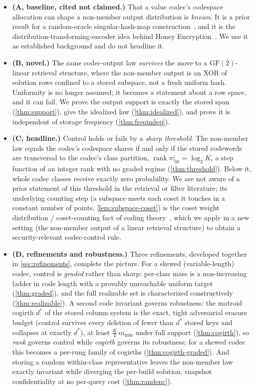 \documentclass[sigconf,nonacm,anonymous,balance=false]{acmart}
\newcommand{\GF}{\mathrm{GF}(2)}
\DeclareMathOperator{\rank}{rank}
\newcommand{\W}{W}                          %
\newcommand{\proj}{\pi}                     %
\begin{document}
\begin{itemize}
  \item \textbf{(A, baseline, cited not claimed.)} That a value codec's codespace
  allocation can shape a non-member output distribution is \emph{known}. It is a
  prior result for a random-oracle singular-hash-map
  construction~\cite{towell_bernoulli_maps}, and it is the
  distribution-transforming-encoder idea behind Honey
  Encryption~\cite{juels2014honey,cheng2019pmte}. We use it as established
  background and do not headline it.
  \item \textbf{(B, novel.)} The same codec-output law \emph{survives} the move to a
  $\GF$-linear retrieval structure, where the non-member output is an XOR of solution
  rows confined to a stored subspace, not a fresh uniform hash. Uniformity is no
  longer assumed; it becomes a statement about a row space, and it can fail. We prove
  the output support is exactly the stored span (\cref{thm:support}), give the
  idealized law (\cref{thm:idealized}), and prove it is independent of storage
  frequency (\cref{thm:freqindep}).
  \item \textbf{(C, headline.)} Control holds or fails by a \emph{sharp threshold}.
  The non-member law equals the codec's codespace shares if and only if the stored
  codewords are transversal to the codec's class partition, $\rank \proj|_{\W} =
  \log_2 K$, a step function of an integer rank with no graded regime
  (\cref{thm:threshold}). Below it, whole codec classes receive exactly zero
  probability. We are not aware of a prior statement of this threshold in the retrieval
  or filter literature; its underlying counting step (a subspace meets each coset it
  touches in a constant number of points, \cref{lem:subspace-coset}) is the coset weight
  distribution / coset-counting fact of coding theory~\cite{macwilliams1977}, which we
  apply in a new setting (the non-member output of a linear retrieval structure) to
  obtain a security-relevant codec-control rule.
  \item \textbf{(D, refinements and robustness.)} Three refinements, developed together in
  \cref{sec:refinements}, complete the picture. For a skewed (variable-length) codec,
  control is \emph{graded} rather than sharp: per-class mass is a non-increasing ladder in
  code length with a provably unreachable uniform target (\cref{thm:graded}), and the full
  realizable set is characterized constructively (\cref{thm:realizable}). A second code
  invariant governs robustness: the matroid cogirth $d^\ast$ of the stored column system is
  the exact, tight adversarial erasure budget (control survives every deletion of fewer than
  $d^\ast$ stored keys and collapses at exactly $d^\ast$), at least $\tfrac{K}{2}\,m_{\min}$
  under full support (\cref{thm:cogirth}), so \emph{rank} governs control while
  \emph{cogirth} governs its robustness; for a skewed codec this becomes a per-rung family
  of cogirths (\cref{thm:cogirth-graded}). And storing a random within-class representative
  leaves the non-member law exactly invariant while diverging the per-build solution,
  snapshot confidentiality at no per-query cost (\cref{thm:randenc}).
\end{itemize}
\end{document}
